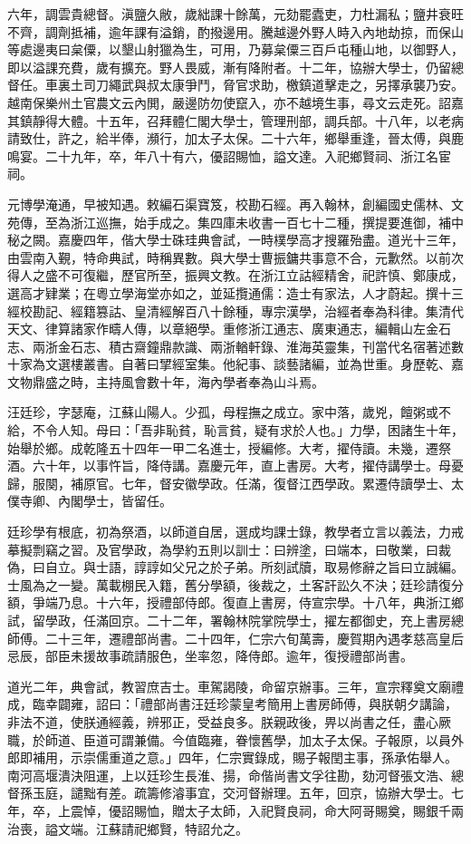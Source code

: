\begin{pinyinscope}
六年，調雲貴總督。滇鹽久敝，歲絀課十餘萬，元劾罷蠹吏，力杜漏私；鹽井衰旺不齊，調劑抵補，逾年課有溢銷，酌撥邊用。騰越邊外野人時入內地劫掠，而保山等處邊夷曰枲僳，以墾山射獵為生，可用，乃募枲僳三百戶屯種山地，以御野人，即以溢課充費，歲有擴充。野人畏威，漸有降附者。十二年，協辦大學士，仍留總督任。車裏土司刀繩武與叔太康爭鬥，脅官求助，檄鎮道擊走之，另擇承襲乃安。越南保樂州土官農文云內閧，嚴邊防勿使竄入，亦不越境生事，尋文云走死。詔嘉其鎮靜得大體。十五年，召拜體仁閣大學士，管理刑部，調兵部。十八年，以老病請致仕，許之，給半俸，瀕行，加太子太保。二十六年，鄉舉重逢，晉太傅，與鹿鳴宴。二十九年，卒，年八十有六，優詔賜恤，謚文達。入祀鄉賢祠、浙江名宦祠。

元博學淹通，早被知遇。敕編石渠寶笈，校勘石經。再入翰林，創編國史儒林、文苑傳，至為浙江巡撫，始手成之。集四庫未收書一百七十二種，撰提要進御，補中秘之闕。嘉慶四年，偕大學士硃珪典會試，一時樸學高才搜羅殆盡。道光十三年，由雲南入覲，特命典試，時稱異數。與大學士曹振鏞共事意不合，元歉然。以前次得人之盛不可復繼，歷官所至，振興文教。在浙江立詁經精舍，祀許慎、鄭康成，選高才肄業；在粵立學海堂亦如之，並延攬通儒：造士有家法，人才蔚起。撰十三經校勘記、經籍篡詁、皇清經解百八十餘種，專宗漢學，治經者奉為科律。集清代天文、律算諸家作疇人傳，以章絕學。重修浙江通志、廣東通志，編輯山左金石志、兩浙金石志、積古齋鐘鼎款識、兩浙輶軒錄、淮海英靈集，刊當代名宿著述數十家為文選樓叢書。自著曰揅經室集。他紀事、談藝諸編，並為世重。身歷乾、嘉文物鼎盛之時，主持風會數十年，海內學者奉為山斗焉。

汪廷珍，字瑟庵，江蘇山陽人。少孤，母程撫之成立。家中落，歲兇，饘粥或不給，不令人知。母曰：「吾非恥貧，恥言貧，疑有求於人也。」力學，困諸生十年，始舉於鄉。成乾隆五十四年一甲二名進士，授編修。大考，擢侍讀。未幾，遷祭酒。六十年，以事忤旨，降侍講。嘉慶元年，直上書房。大考，擢侍講學士。母憂歸，服闋，補原官。七年，督安徽學政。任滿，復督江西學政。累遷侍讀學士、太僕寺卿、內閣學士，皆留任。

廷珍學有根底，初為祭酒，以師道自居，選成均課士錄，教學者立言以義法，力戒摹擬剽竊之習。及官學政，為學約五則以訓士：曰辨塗，曰端本，曰敬業，曰裁偽，曰自立。與士語，諄諄如父兄之於子弟。所刻試牘，取易修辭之旨曰立誠編。士風為之一變。萬載棚民入籍，舊分學額，後裁之，土客訐訟久不決；廷珍請復分額，爭端乃息。十六年，授禮部侍郎。復直上書房，侍宣宗學。十八年，典浙江鄉試，留學政，任滿回京。二十二年，署翰林院掌院學士，擢左都御史，充上書房總師傅。二十三年，遷禮部尚書。二十四年，仁宗六旬萬壽，慶賀期內遇孝慈高皇后忌辰，部臣未援故事疏請服色，坐率忽，降侍郎。逾年，復授禮部尚書。

道光二年，典會試，教習庶吉士。車駕謁陵，命留京辦事。三年，宣宗釋奠文廟禮成，臨幸闢雍，詔曰：「禮部尚書汪廷珍蒙皇考簡用上書房師傅，與朕朝夕講論，非法不道，使朕通經義，辨邪正，受益良多。朕親政後，畀以尚書之任，盡心厥職，於師道、臣道可謂兼備。今值臨雍，眷懷舊學，加太子太保。子報原，以員外郎即補用，示崇儒重道之意。」四年，仁宗實錄成，賜子報閏主事，孫承佑舉人。南河高堰潰決阻運，上以廷珍生長淮、揚，命偕尚書文孚往勘，劾河督張文浩、總督孫玉庭，譴黜有差。疏籌修濬事宜，交河督辦理。五年，回京，協辦大學士。七年，卒，上震悼，優詔賜恤，贈太子太師，入祀賢良祠，命大阿哥賜奠，賜銀千兩治喪，謚文端。江蘇請祀鄉賢，特詔允之。


\end{pinyinscope}
